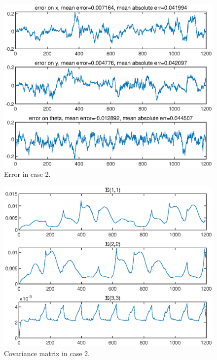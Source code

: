 \documentclass[11pt,a4paper]{article}
\begin{document}
\begin{figure}[H]
	\centering
	\includegraphics[width=0.9\columnwidth]{Figure/Case_2_Figure_2.eps}
	\caption{Error in case 2.}
	\label{fig:Case_2_Figure_2}
\end{figure}

\begin{figure}[H]
	\centering
	\includegraphics[width=0.9\columnwidth]{Figure/Case_2_Figure_3.eps}
	\caption{Covariance matrix in case 2.}
	\label{fig:Case_2_Figure_3}
\end{figure}

\newpage
\end{document}
